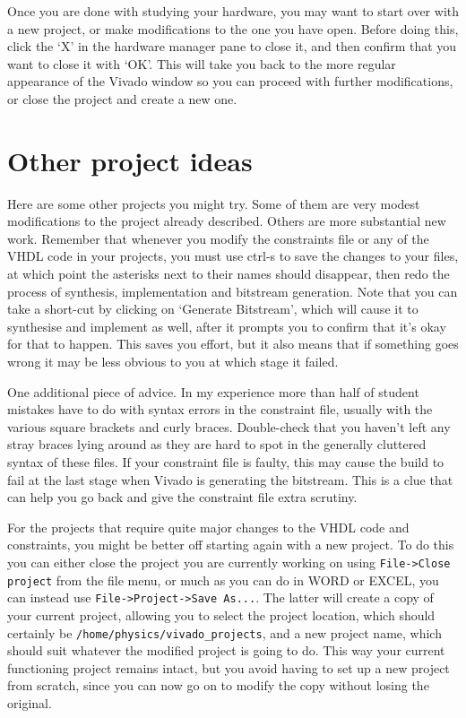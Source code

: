\documentclass[../physical_computing.tex]{subfiles}
\begin{document}
Once you are done with studying your hardware, you may want to start over with a new project, or make modifications to the one you have open. Before doing this, click the `X' in the hardware manager pane to close it, and then confirm that you want to close it with `OK'. This will take you back to the more regular appearance of the Vivado window so you can proceed with further modifications, or close the project and create a new one.

\section{Other project ideas}
\label{sec:other_ideas}

Here are some other projects you might try. Some of them are very modest modifications to the project already described. Others are more substantial new work. Remember that whenever you modify the constraints file or any of the VHDL code in your projects, you must use ctrl-s to save the changes to your files, at which point the asterisks next to their names should disappear, then redo the process of synthesis, implementation and bitstream generation. Note that you can take a short-cut by clicking on `Generate Bitstream', which will cause it to synthesise and implement as well, after it prompts you to confirm that it's okay for that to happen. This saves you effort, but it also means that if something goes wrong it may be less obvious to you at which stage it failed.

One additional piece of advice. In my experience more than half of student mistakes have to do with syntax errors in the constraint file, usually with the various square brackets and curly braces. Double-check that you haven't left any stray braces lying around as they are hard to spot in the generally cluttered syntax of these files. If your constraint file is faulty, this may cause the build to fail at the last stage when Vivado is generating the bitstream. This is a clue that can help you go back and give the constraint file extra scrutiny.

For the projects that require quite major changes to the VHDL code and constraints, you might be better off starting again with a new project. To do this you can either close the project you are currently working on using \texttt{File->Close project} from the file menu, or much as you can do in WORD or EXCEL, you can instead use \texttt{File->Project->Save As...}. The latter will create a copy of your current project, allowing you to select the project location, which should certainly be \texttt{/home/physics/vivado\_projects}, and a new project name, which should suit whatever the modified project is going to do. This way your current functioning project remains intact, but you avoid having to set up a new project from scratch, since you can now go on to modify the copy without losing the original.
\end{document}
